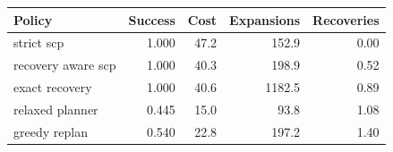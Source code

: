 \begin{tabular}{lrrrr}
\toprule
Policy & Success & Cost & Expansions & Recoveries \\
\midrule
strict scp & 1.000 & 47.2 & 152.9 & 0.00 \\
recovery aware scp & 1.000 & 40.3 & 198.9 & 0.52 \\
exact recovery & 1.000 & 40.6 & 1182.5 & 0.89 \\
relaxed planner & 0.445 & 15.0 & 93.8 & 1.08 \\
greedy replan & 0.540 & 22.8 & 197.2 & 1.40 \\
\bottomrule
\end{tabular}
